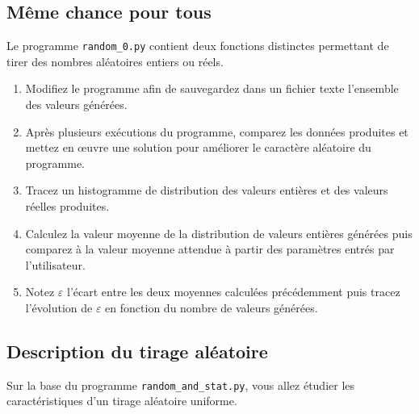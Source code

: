 \subsection{Même chance pour tous}

Le programme \texttt{random\_0.py}  contient deux fonctions distinctes
permettant de tirer des nombres aléatoires entiers ou réels.

\begin{enumerate}
\item Modifiez le programme afin  de sauvegardez dans un fichier texte
  l'ensemble des valeurs générées.

\item Après  plusieurs exécutions  du programme, comparez  les données
  produites  et mettez  en \oe  uvre  une solution  pour améliorer  le
  caractère aléatoire du programme.
  
\item Tracez  un histogramme de  distribution des valeurs  entières et
  des valeurs réelles produites.

\item  Calculez  la  valeur  moyenne de  la  distribution  de  valeurs
  entières  générées puis  comparez  à la  valeur  moyenne attendue  à
  partir des paramètres entrés par l'utilisateur.

\item Notez  $\varepsilon$ l'écart  entre les deux  moyennes calculées
  précédemment puis tracez l'évolution de $\varepsilon$ en fonction du
  nombre de valeurs générées.

\end{enumerate}

\subsection{Description du tirage aléatoire}

Sur  la base  du programme  \texttt{random\_and\_stat.py}, vous  allez
étudier les caractéristiques d'un tirage aléatoire uniforme.


